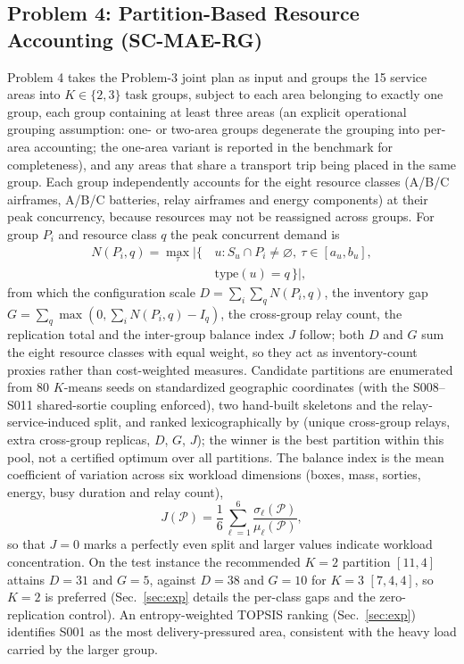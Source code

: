 \documentclass[journal]{IEEEtran}
\begin{document}
\subsection{Problem 4: Partition-Based Resource Accounting (SC-MAE-RG)}
Problem 4 takes the Problem-3 joint plan as input and groups the 15 service
areas into $K\in\{2,3\}$ task groups, subject to each area belonging to exactly
one group, each group containing at least three areas (an explicit operational
grouping assumption: one- or two-area groups degenerate the grouping into
per-area accounting; the one-area variant is reported in the benchmark for
completeness), and any areas that share a transport trip being placed in the
same group. Each group independently accounts
for the eight resource classes (A/B/C airframes, A/B/C batteries, relay airframes
and energy components) at their peak concurrency, because resources may not be
reassigned across groups. For group $P_i$ and resource class $q$ the peak
concurrent demand is
\begin{equation}
\begin{aligned}
N(P_i,q)=\max_{\tau}\bigl|\{\,&u: S_u\cap P_i\ne\varnothing,\
\tau\in[a_u,b_u],\\
&\mathrm{type}(u)=q\,\}\bigr|,
\end{aligned}
\end{equation}
from which the configuration scale $D=\sum_i\sum_q N(P_i,q)$, the inventory gap
$G=\sum_q\max(0,\sum_i N(P_i,q)-I_q)$, the cross-group relay count, the
replication total and the inter-group balance index $J$ follow; both $D$ and
$G$ sum the eight resource classes with equal weight, so they act as
inventory-count proxies rather than cost-weighted measures. Candidate
partitions are enumerated from $80$ $K$-means seeds on standardized geographic
coordinates (with the S008--S011 shared-sortie coupling enforced), two
hand-built skeletons and the relay-service-induced split, and ranked
lexicographically by (unique cross-group relays, extra cross-group replicas,
$D$, $G$, $J$); the winner is the best partition within this pool, not a
certified optimum over all partitions. The balance index is the mean
coefficient of variation across six workload dimensions (boxes, mass, sorties,
energy, busy duration and relay count),
\begin{equation}
J(\mathcal{P})=\frac{1}{6}\sum_{\ell=1}^{6}\frac{\sigma_{\ell}(\mathcal{P})}
{\mu_{\ell}(\mathcal{P})},
\end{equation}
so that $J{=}0$ marks a perfectly even split and larger values indicate
workload concentration. On the test instance the recommended $K{=}2$ partition
$[11,4]$ attains $D{=}31$ and $G{=}5$, against $D{=}38$ and $G{=}10$ for
$K{=}3$ $[7,4,4]$, so $K{=}2$ is preferred (Sec.~\ref{sec:exp} details the
per-class gaps and the zero-replication control). An
entropy-weighted TOPSIS ranking (Sec.~\ref{sec:exp}) identifies S001 as the
most delivery-pressured area, consistent with the heavy load carried by the
larger group.
\end{document}
